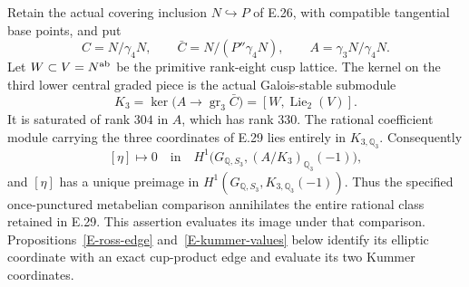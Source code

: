 \begin{proposition}
\label{E-remaining-kernel}
Retain the actual covering inclusion $N\hookrightarrow P$ of E.26,
with compatible tangential base points, and put
\[
 C=N/\gamma_4N,\qquad
 \bar C=N/(P''\gamma_4N),\qquad
 A=\gamma_3N/\gamma_4N.
\]
Let $W\subset V=N^{\rm ab}$ be the primitive rank-eight
cusp lattice. The kernel on the third lower central graded piece is
the actual Galois-stable submodule
\[
 K_3=\ker\bigl(A\longrightarrow\operatorname{gr}_3\bar C\bigr)
       =[W,\operatorname{Lie}_2(V)].
 \tag{E.30.1}
\]
It is saturated of rank $304$ in $A$, which has rank $330$.
The rational coefficient module carrying the three coordinates of
E.29 lies entirely in $K_{3,\mathbb Q_3}$. Consequently
\[
 [\eta]\longmapsto0\quad\text{in}\quad
 H^1\bigl(G_{\mathbb Q,S_3},(A/K_3)_{\mathbb Q_3}(-1)\bigr),
 \tag{E.30.2}
\]
and $[\eta]$ has a unique preimage in
$H^1(G_{\mathbb Q,S_3},K_{3,\mathbb Q_3}(-1))$.
Thus the specified once-punctured metabelian comparison annihilates
the entire rational class retained in E.29. This assertion evaluates
its image under that comparison. Propositions~\ref{E-ross-edge}
and~\ref{E-kummer-values} below identify its elliptic coordinate
with an exact cup-product edge and evaluate its two Kummer coordinates.
\end{proposition}

